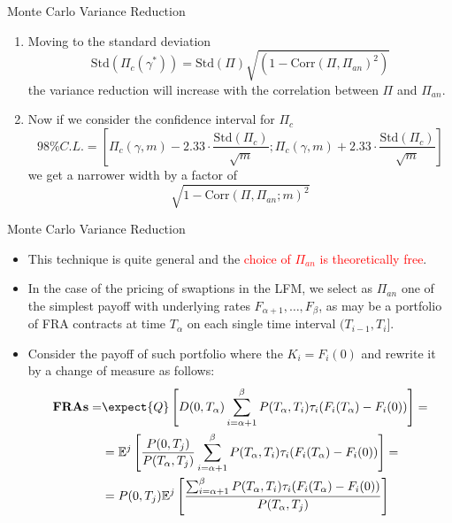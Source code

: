 \documentclass{beamer}
\begin{document}
\begin{frame}{Monte Carlo Variance Reduction}
	\begin{enumerate}\addtocounter{enumi}{3}
  \item<1-> Moving to the standard deviation
	\begin{equation*}
		\text{Std}(\Pi_c(\gamma^*)) = \text{Std}(\Pi) \sqrt{(1 - \text{Corr}(\Pi, \Pi_{an})^2)}
	\end{equation*}
	the variance reduction will increase with the correlation between $\Pi$ and $\Pi_{an}$. 
	\item<2-> Now if we consider the confidence interval for $\Pi_c$ 
	\begin{equation*}
		98\% C.L. =\left[\Pi_c(\gamma,m) - 2.33\cdot\frac{\text{Std}(\Pi_c)}{\sqrt{m}};\Pi_c(\gamma,m) + 2.33\cdot\frac{\text{Std}(\Pi_c)}{\sqrt{m}}\right] 
	\end{equation*}
	we get a narrower width by a factor of
	\begin{equation*}
		\sqrt{1 - \text{Corr}(\Pi, \Pi_{an}; m)^2}
	\end{equation*}
	\end{enumerate}
\end{frame}

\begin{frame}{Monte Carlo Variance Reduction}
  \begin{itemize}
  \item<1-> This technique is quite general and the \textcolor{red}{choice of $\Pi_{an}$ is theoretically free}.
  \item<2-> In the case of the pricing of swaptions in the LFM, we select as $\Pi_{an}$ one of the simplest payoff with underlying rates $F_{\alpha+1},\ldots,F_\beta$, as may be a portfolio of FRA contracts at time $T_\alpha$ on each single time interval $(T_{i-1}, T_i]$.
  \item<3-> Consider the payoff of such portfolio where the $K_i = F_i(0)$ and rewrite it by a change of measure as follows:
    \begin{equation*}
      \begin{aligned}
        \textbf{FRAs} = &\expect{Q}\left[D(0,T_\alpha)\sum_{i=\alpha+1}^\beta P(T_\alpha,T_i)\tau_i(F_i(T_\alpha) - F_i(0))\right] = \\
        &=\mathbb{E}^j\left[\frac{P(0,T_j)}{P(T_\alpha,T_j)}\sum_{i=\alpha+1}^\beta P(T_\alpha,T_i)\tau_i(F_i(T_\alpha) - F_i(0))\right] = \\
        & = P(0,T_j)\mathbb{E}^j\left[\frac{\sum_{i=\alpha+1}^\beta P(T_\alpha,T_i)\tau_i(F_i(T_\alpha) - F_i(0))}{P(T_\alpha,T_j)}\right]
      \end{aligned}
    \end{equation*}
  \end{itemize}
\end{frame}
\end{document}
